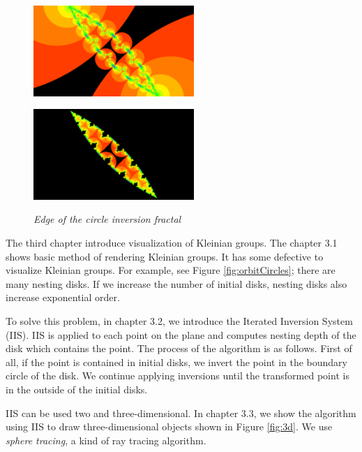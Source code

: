 \documentclass[uplatex, dvipdfmx]{article}
\begin{document}
\begin{figure}[htbp]
 \begin{minipage}[t]{0.5\hsize}
  \center
  \includegraphics[height=1.35in, keepaspectratio]{../src/img/application/internal/schottky.png}
  \subcaption{\textit{}}
  \label{fig:schottkyAll}
  \hspace*{\fill}
 \end{minipage}
 \begin{minipage}[t]{0.5\hsize}
  \center
  \includegraphics[height=1.35in, keepaspectratio]{../src/img/application/internal/schottkyEdge.png}
  \subcaption{\textit{}}
  \label{fig:schottkyEdge}
  \hspace*{\fill}
 \end{minipage}
 \caption{\textit{Edge of the circle inversion fractal}}
 \label{fig:schottkyDivide}
\end{figure}

The third chapter introduce visualization of Kleinian groups.
The chapter 3.1 shows basic method of rendering Kleinian groups.
It has some defective to visualize Kleinian groups.
For example, see Figure \ref{fig:orbitCircles}; there are many nesting
disks. If we increase the number of initial disks, nesting disks also
increase exponential order.

To solve this problem, in chapter 3.2, we introduce the Iterated
Inversion System (IIS).
IIS is applied to each point on the plane and computes nesting depth of
the disk which contains the point.
The process of the algorithm is as follows.
First of all, if the point is contained in initial disks, we invert the
point in the boundary circle of the disk.
We continue applying inversions until the transformed point is in the
outside of the initial disks.

IIS can be used two and three-dimensional.
In chapter 3.3, we show the algorithm using IIS to draw three-dimensional
objects shown in Figure \ref{fig:3d}.
We use \textit{sphere tracing}, a kind of ray tracing algorithm.
\end{document}
